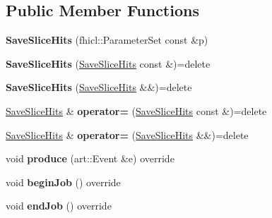 \subsection*{Public Member Functions}
\begin{DoxyCompactItemize}
\item 
\hypertarget{classSaveSliceHits_a56e7e4878a9c004791e1d5a1c0555cd2}{{\bfseries Save\-Slice\-Hits} (fhicl\-::\-Parameter\-Set const \&p)}\label{classSaveSliceHits_a56e7e4878a9c004791e1d5a1c0555cd2}

\item 
\hypertarget{classSaveSliceHits_a21f4a1e618ae4562dd6aa2612f06849b}{{\bfseries Save\-Slice\-Hits} (\hyperlink{classSaveSliceHits}{Save\-Slice\-Hits} const \&)=delete}\label{classSaveSliceHits_a21f4a1e618ae4562dd6aa2612f06849b}

\item 
\hypertarget{classSaveSliceHits_a277a656266a5bfdac6491f0a59b8e441}{{\bfseries Save\-Slice\-Hits} (\hyperlink{classSaveSliceHits}{Save\-Slice\-Hits} \&\&)=delete}\label{classSaveSliceHits_a277a656266a5bfdac6491f0a59b8e441}

\item 
\hypertarget{classSaveSliceHits_ab30b09c8d4e1e79dfb9f105f412c90a1}{\hyperlink{classSaveSliceHits}{Save\-Slice\-Hits} \& {\bfseries operator=} (\hyperlink{classSaveSliceHits}{Save\-Slice\-Hits} const \&)=delete}\label{classSaveSliceHits_ab30b09c8d4e1e79dfb9f105f412c90a1}

\item 
\hypertarget{classSaveSliceHits_ae5329e70a6f07aef0b9a958a6abd0560}{\hyperlink{classSaveSliceHits}{Save\-Slice\-Hits} \& {\bfseries operator=} (\hyperlink{classSaveSliceHits}{Save\-Slice\-Hits} \&\&)=delete}\label{classSaveSliceHits_ae5329e70a6f07aef0b9a958a6abd0560}

\item 
\hypertarget{classSaveSliceHits_abec4f170d648b1855d5f26b563148cf6}{void {\bfseries produce} (art\-::\-Event \&e) override}\label{classSaveSliceHits_abec4f170d648b1855d5f26b563148cf6}

\item 
\hypertarget{classSaveSliceHits_a0ebe38a8c4f48a1d9c405787d076635a}{void {\bfseries begin\-Job} () override}\label{classSaveSliceHits_a0ebe38a8c4f48a1d9c405787d076635a}

\item 
\hypertarget{classSaveSliceHits_a48f6a563a927b9ff37d3a6f07462d8fd}{void {\bfseries end\-Job} () override}\label{classSaveSliceHits_a48f6a563a927b9ff37d3a6f07462d8fd}

\end{DoxyCompactItemize}
